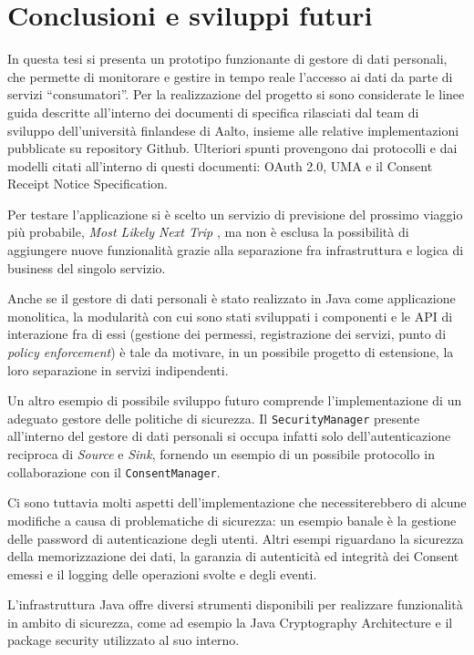 \chapter{Conclusioni e sviluppi futuri}
\label{capitolo6}
\thispagestyle{empty}

\noindent In questa tesi si presenta un prototipo funzionante di gestore di dati personali, che permette di monitorare e gestire in tempo reale l’accesso ai dati da parte di servizi “consumatori”. Per la realizzazione del progetto si sono considerate le linee guida descritte all’interno dei documenti di specifica rilasciati dal team di sviluppo dell’universit\`a finlandese di Aalto, insieme alle relative implementazioni pubblicate su repository Github. Ulteriori spunti provengono dai protocolli e dai modelli citati all’interno di questi documenti: OAuth 2.0, UMA e il Consent Receipt Notice Specification.

Per testare l’applicazione si \`e scelto un servizio di previsione del prossimo viaggio pi\`u probabile, \textit{Most Likely Next Trip} \cite{MLNT}, ma non \`e esclusa la possibilit\`a di aggiungere nuove funzionalit\`a grazie alla separazione fra infrastruttura e logica di business del singolo servizio.

Anche se il gestore di dati personali \`e stato realizzato in Java come applicazione monolitica, la modularit\`a con cui sono stati sviluppati i componenti e le API di interazione fra di essi (gestione dei permessi, registrazione dei servizi, punto di \textit{policy enforcement}) \`e tale da motivare, in un possibile progetto di estensione, la loro separazione in servizi indipendenti.

Un altro esempio di possibile sviluppo futuro comprende l’implementazione di un adeguato gestore delle politiche di sicurezza. Il \texttt{SecurityManager} presente all’interno del gestore di dati personali si occupa infatti solo dell’autenticazione reciproca di \textit{Source} e \textit{Sink}, fornendo un esempio di un possibile protocollo in collaborazione con il \texttt{ConsentManager}.

Ci sono tuttavia molti aspetti dell’implementazione che necessiterebbero di alcune modifiche a causa di problematiche di sicurezza: un esempio banale \`e la gestione delle password di autenticazione degli utenti. Altri esempi riguardano la sicurezza della memorizzazione dei dati, la garanzia di autenticit\`a ed integrit\`a dei Consent emessi e il logging delle operazioni svolte e degli eventi.

L’infrastruttura Java offre diversi strumenti disponibili per realizzare funzionalit\`a in ambito di sicurezza, come ad esempio la Java Cryptography Architecture e il package security utilizzato al suo interno.

